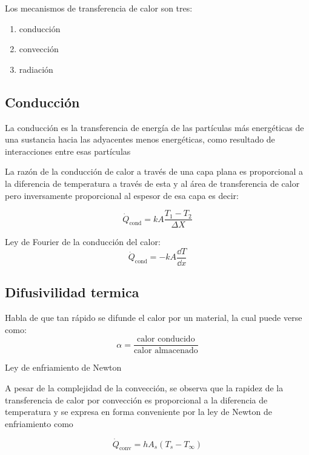 \documentclass[11pt]{report}
\theoremstyle{plain}
\theoremstyle{definition}
\begin{document}
Los mecanismos de transferencia de calor son tres:
\begin{enumerate}
	\item conducción
	\item convección
	\item radiación
\end{enumerate}


\subsection{Conducción} %

La conducción es la transferencia de energía de las partículas más energéticas de una sustancia hacia las adyacentes menos energéticas, como resultado de interacciones entre esas partículas

La razón de la conducción de calor a través de una capa plana es proporcional a la diferencia de temperatura a través de esta y al área de transferencia de calor pero inversamente proporcional al espesor de esa capa es decir:

\begin{equation*}
	\dot{Q}_{\text{cond}} = kA\frac{T_1 - T_2}{\Delta X}
\end{equation*}

Ley de Fourier de la conducción del calor:
\begin{equation}
	\dot{Q}_{\text{cond}} = -kA\frac{\dd{T}}{\dd{x}}
	\label{eq:ley_conduccion_fourier}
\end{equation}

\subsection{Difusivilidad termica}

Habla de que tan rápido se difunde el calor por un material, la cual puede verse como:
\begin{equation*}
	\alpha = \frac{\text{calor conducido}}{\text{calor almacenado}}
\end{equation*}


Ley de enfriamiento de Newton

A pesar de la complejidad de la convección, se observa que la rapidez de la transferencia de calor por convección es proporcional a la diferencia de temperatura y se expresa en forma conveniente por la ley de Newton de enfriamiento como

\begin{equation}
	\dot{Q}_\text{conv} = hA_s(T_s-T_\infty)
	\label{eq:ley_enfriamiento_newton}
\end{equation}
\end{document}
